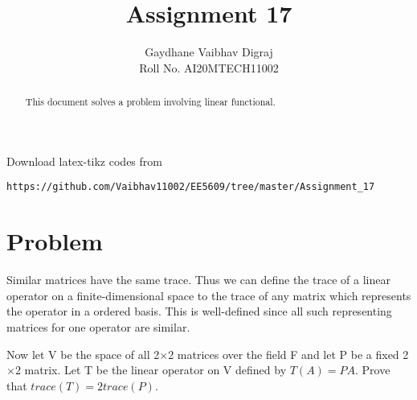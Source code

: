 \documentclass[journal,12pt,twocolumn]{IEEEtran}
\begin{document}
     \def\rightbox#1{\makebox[0in][r]{#1}}
     \def\centbox#1{\makebox[0in]{#1}}
     \def\topbox#1{\raisebox{-\baselineskip}[0in][0in]{#1}}
     \def\midbox#1{\raisebox{-0.5\baselineskip}[0in][0in]{#1}}
\vspace{3cm}
\title{Assignment 17}
\author{Gaydhane Vaibhav Digraj \\ Roll No. AI20MTECH11002}
\maketitle
\newpage
\bigskip
\renewcommand{\thefigure}{\theenumi}
\renewcommand{\thetable}{\theenumi}
\begin{abstract}
This document solves a problem involving linear functional.
\end{abstract}
%
Download latex-tikz codes from 
%
\begin{lstlisting}
https://github.com/Vaibhav11002/EE5609/tree/master/Assignment_17
\end{lstlisting}
%
\section{Problem}
Similar matrices have the same trace. Thus we can define the trace of a linear operator on a finite-dimensional space to the trace of any matrix which represents the operator in a ordered basis. This is well-defined since all such representing matrices for one operator are similar. 

Now let V be the space of all 2$\times$2 matrices over the field F and let P be a fixed 2$\times$2 matrix. Let T be the linear operator on V defined by $T(A)=PA$. Prove that $trace(T)=2trace(P)$. 
\end{document}
